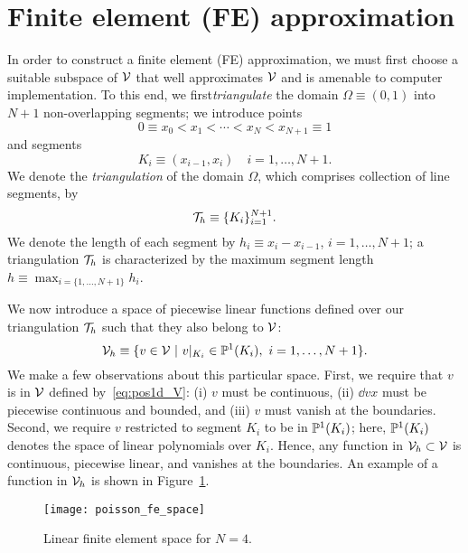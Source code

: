 \section{Finite element (FE) approximation}
In order to construct a finite element (FE) approximation, we must first choose a suitable subspace of $\mathcal{V}$ that well approximates $\mathcal{V}$ and is amenable to computer implementation. To this end, we first\emph{triangulate} the domain $\Omega \equiv (0,1)$ into $N+1$ non-overlapping segments; we introduce points
\begin{equation*}
  0 \equiv x_0 < x_1 < \cdots < x_N < x_{N+1} \equiv 1
\end{equation*}
and segments
\begin{equation*}
  K_i \equiv (x_{i-1}, x_i) \quad i = 1,\dots,N+1.
\end{equation*}
We denote the \emph{triangulation} of the domain $\Omega$, which comprises collection of line segments, by
\begin{equation}
  \mathcal{T}_h \equiv \{ K_i \}_{i=1}^{N+1}.
  \label{eq:pos1d_Th}
\end{equation}
We denote the length of each segment by $h_i \equiv x_i - x_{i-1}$, $i = 1,\dots,N+1$; a triangulation $\mathcal{T}_h$ is characterized by the maximum segment length $h \equiv \max_{i=\{ 1,\dots,N+1\}} h_i$.

We now introduce a space of piecewise linear functions defined over our triangulation $\mathcal{T}_h$ such that they also belong to $\mathcal{V}$:
\begin{equation}
  \mathcal{V}_h \equiv \{ v \in \mathcal{V} \ | \ v|_{K_i} \in \mathbb{P}^1(K_i), \ i = 1,\dots,N+1\}.
  \label{eq:pos1d_Vh}
\end{equation}
We make a few observations about this particular space.  First, we require that $v$ is in $\mathcal{V}$ defined by~\eqref{eq:pos1d_V}: (i) $v$ must be continuous, (ii) $\dd{v}{x}$ must be piecewise continuous and bounded, and (iii) $v$ must vanish at the boundaries.  Second, we require $v$ restricted to segment $K_i$ to be in $\mathbb{P}^1(K_i)$; here, $\mathbb{P}^1(K_i)$ denotes the space of linear polynomials over $K_i$.  Hence, any function in $\mathcal{V}_h \subset \mathcal{V}$ is continuous, piecewise linear, and vanishes at the boundaries. An example of a function in $\mathcal{V}_h$ is shown in Figure~\ref{fig:pos1d_fe_space}.

\begin{figure}
  \centering
  \texttt{[image: poisson\_fe\_space]}
  \caption{Linear finite element space for $N = 4$.}
  \label{fig:pos1d_fe_space}
\end{figure}

